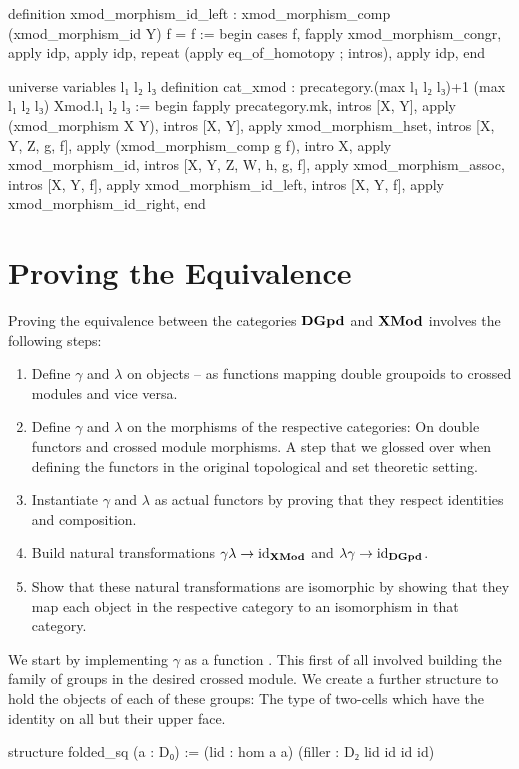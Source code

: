 \begin{leancodebr}
  definition xmod_morphism_id_left :
    xmod_morphism_comp (xmod_morphism_id Y) f = f :=
  begin
    cases f,
    fapply xmod_morphism_congr,
        apply idp,
      apply idp,
    repeat (apply eq_of_homotopy ; intros),
    apply idp,
  end

  universe variables l₁ l₂ l₃
  definition cat_xmod :
    precategory.{(max l₁ l₂ l₃)+1 (max l₁ l₂ l₃)} Xmod.{l₁ l₂ l₃} :=
  begin
    fapply precategory.mk,
      intros [X, Y], apply (xmod_morphism X Y),
      intros [X, Y], apply xmod_morphism_hset,
      intros [X, Y, Z, g, f], apply (xmod_morphism_comp g f),
      intro X, apply xmod_morphism_id,
      intros [X, Y, Z, W, h, g, f], apply xmod_morphism_assoc,
      intros [X, Y, f], apply xmod_morphism_id_left,
    intros [X, Y, f], apply xmod_morphism_id_right,
  end
\end{leancodebr}



\section{Proving the Equivalence}

Proving the equivalence between the categories $\mathbf{DGpd}$ and $\mathbf{XMod}$ involves the
following steps:
\begin{enumerate}
\item Define $\gamma$ and $\lambda$ on objects -- as functions mapping double
groupoids to crossed modules and vice versa.
\item Define $\gamma$ and $\lambda$ on the morphisms of the respective categories:
On double functors and crossed module morphisms.
A step that we glossed over when defining the functors in the original topological and
set theoretic setting.
\item Instantiate $\gamma$ and $\lambda$ as actual functors by proving that
they respect identities and composition.
\item Build natural transformations $\gamma\lambda \to \operatorname{id}_{\mathbf{XMod}}$ and
$\lambda\gamma \to \operatorname{id}_{\mathbf{DGpd}}$.
\item Show that these natural transformations are isomorphic by showing that they
map each object in the respective category to an isomorphism in that category.
\end{enumerate} %

We start by implementing $\gamma$ as a function .
This first of all involved building the family of groups in the desired
crossed module.
We create a further structure to hold the objects of each of these groups:
The type of two-cells which have the identity on all but their upper face.
\begin{leancodebr}
  structure folded_sq (a : D₀) :=
    (lid : hom a a)
    (filler : D₂ lid id id id)
\end{leancodebr}


